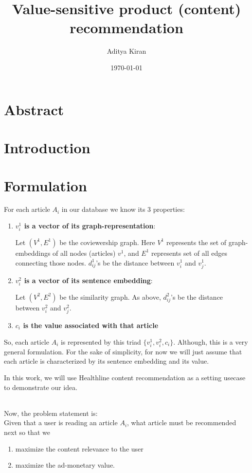 \documentclass[11]{article}
\title{Value-sensitive product (content) recommendation}
\author{Aditya Kiran }
\date{\today}
\begin{document}
\maketitle
\section{Abstract}


\section{Introduction}

\section{Formulation}
For each article $A_i$ in our database we know its 3 properties:
\begin{enumerate}

\item \textbf{$v^1_i$ is a vector of its graph-representation}:

Let $(V^1, E^1)$ be the coviewership graph. Here $V^1$ represents the set of graph-embeddings of all nodes (articles) $v^1$, and $E^1$ represents set of all edges connecting those nodes.  $d^1_{ij}$'s be the distance between $v^1_i$ and $v^1_j$. 
 
\item \textbf{$v^2_i$ is a vector of its sentence embedding}:

Let $(V^2, E^2)$ be the similarity graph. As above, $d^2_{ij}$'s be the distance between $v^2_i$ and $v^2_j$.

\item \textbf{$c_i$ is the value associated with that article}
\end{enumerate}
So, each article $A_i$ is represented by this triad $\{ v^1_i, v^2_i, c_i \}$. Although, this is a very general formulation. For the sake of simplicity, for now we will just assume that each  article is characterized by its sentence embedding and its value.

In this work, we will use Healthline content recommendation as a setting usecase to demonstrate our idea.

\vspace{0.3cm}

\\
Now, the problem statement is: \\
Given that a user is reading an article $A_i$, what article must be recommended next so that we
\begin{enumerate}
\item maximize the content relevance to the user
\item maximize the ad-monetary value.
\end{enumerate} 
\end{document}
